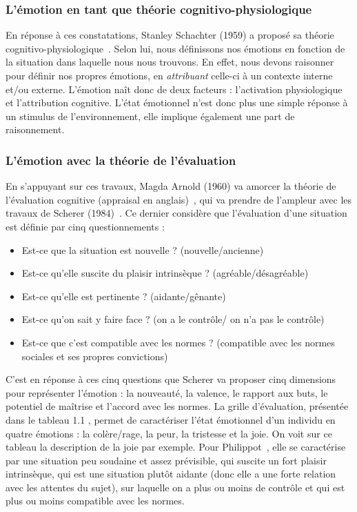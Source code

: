 \subsubsection{L'émotion en tant que théorie cognitivo-physiologique}
En réponse à ces constatations, Stanley Schachter (1959) a proposé sa théorie cognitivo-physiologique~\cite{Schachter1959,Schachter1962}. Selon lui, nous définissons nos émotions en fonction de la situation dans laquelle nous nous trouvons. En effet, nous devons raisonner pour définir nos propres émotions, en \textit{attribuant} celle-ci à un contexte interne et/ou externe. L'émotion naît donc de deux facteurs : l'activation physiologique et l'attribution cognitive. L'état émotionnel n'est donc plus une simple réponse à un stimulus de l'environnement, elle implique également une part de raisonnement.


\subsubsection{L'émotion avec la théorie de l'évaluation}
En s'appuyant sur ces travaux, Magda Arnold (1960) va amorcer la théorie de l'évaluation cognitive (appraisal en anglais)~\cite{Arnold1960}, qui va prendre de l'ampleur avec les travaux de Scherer (1984)~\cite{Scherer1984}. Ce dernier considère que l'évaluation d'une situation est définie par cinq questionnements :
\begin{itemize}
  \item Est-ce que la situation est nouvelle ? (nouvelle/ancienne)
  \item Est-ce qu'elle suscite du plaisir intrinsèque ? (agréable/désagréable)
  \item Est-ce qu'elle est pertinente ? (aidante/gênante)
  \item Est-ce qu'on sait y faire face ? (on a le contrôle/ on n'a pas le contrôle)
  \item Est-ce que c'est compatible avec les normes ? (compatible avec les normes sociales et ses propres convictions)
\end{itemize}

C'est en réponse à ces cinq questions que Scherer va proposer cinq dimensions pour représenter l'émotion : la nouveauté, la valence, le rapport aux buts, le potentiel de maîtrise et l'accord avec les normes. La grille d'évaluation, présentée dans le tableau 1.1
, permet de caractériser l'état émotionnel d'un individu en quatre émotions : la colère/rage, la peur, la tristesse et la joie.
On voit sur ce tableau la description de la joie par exemple. Pour Philippot~\cite{Philippot2002}, elle se caractérise par une situation peu soudaine et assez prévisible, qui suscite un fort plaisir intrinsèque, qui est une situation plutôt aidante (donc elle a une forte relation avec les attentes du sujet), sur laquelle on a plus ou moins de contrôle et qui est plus ou moins compatible avec les normes.

